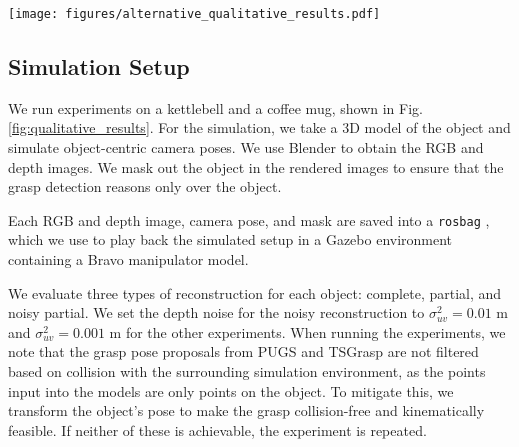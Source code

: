 \begin{figure*}[t]
    \centering
    \texttt{[image: figures/alternative\_qualitative\_results.pdf]}
    \caption{Results from data collected from the test tank. 
    The columns represent separate logs collected in the test tank.
    Each log contains images of partial views from different angles of the kettlebell.
    The first and second columns are from the same log, but the first column shows the pointcloud without the aggressive filtering.
    Here, we show a qualitative comparison of the proposed grasp poses from PUGS (green) and TSGrasp (red) \cite{player_real-time_2023}.
    The reconstructions are colored by the weighted confidence output of PUGS and overlaid on a representative 3D model of the object for easy visualization.
    Higher confidence regions are colored in red, and lower confidence regions are colored in blue.
    }
    \label{fig:qualitative_results}
    \vspace{-4mm}
\end{figure*}


\subsection{Simulation Setup}
We run experiments on a kettlebell and a coffee mug, shown in Fig. \ref{fig:qualitative_results}. 
For the simulation, we take a 3D model of the object and simulate object-centric camera poses.
We use Blender \cite{blender} to obtain the RGB and depth images.
We mask out the object in the rendered images to ensure that the grasp detection reasons only over the object.

Each RGB and depth image, camera pose, and mask are saved into a \texttt{rosbag} \cite{ros}, which we use to play back the simulated setup in a Gazebo \cite{gazebo} environment containing a Bravo manipulator \cite{noauthor_underwater_nodate} model.

We evaluate three types of reconstruction for each object: complete, partial, and noisy partial.
We set the depth noise for the noisy reconstruction to $\sigma_{uv}^2=0.01$ m and $\sigma_{uv}^2=0.001$ m for the other experiments.
When running the experiments, we note that the grasp pose proposals from PUGS and TSGrasp \cite{player_real-time_2023} are not filtered based on collision with the surrounding simulation environment, as the points input into the models are only points on the object.
To mitigate this, we transform the object's pose to make the grasp collision-free and kinematically feasible. 
If neither of these is achievable, the experiment is repeated.

